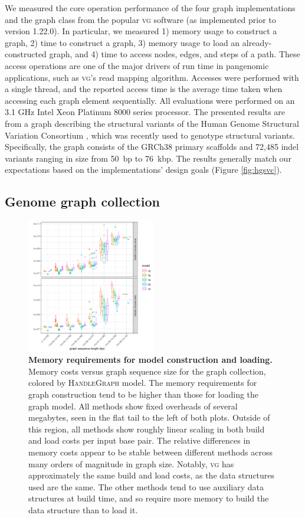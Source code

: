 \documentclass{bioinfo}
\begin{document}
We measured the core operation performance of the four graph implementations and the graph class from the popular \textsc{vg} software (as implemented prior to version 1.22.0).
In particular, we measured 1) memory usage to construct a graph, 2) time to construct a graph, 3) memory usage to load an already-constructed graph, and 4) time to access nodes, edges, and steps of a path.
These access operations are one of the major drivers of run time in pangenomic applications, such as \textsc{vg}'s read mapping algorithm. 
Accesses were performed with a single thread, and the reported access time is the average time taken when accessing each graph element sequentially.
All evaluations were performed on an 3.1 GHz Intel Xeon Platinum 8000 series processor.
The presented results are from a graph describing the structural variants of the Human Genome Structural Variation Consortium \citep{chaisson2019multi}, which was recently used to genotype structural variants\citep{hickey2020genotyping}.
Specifically, the graph consists of the GRCh38 primary scaffolds and 72,485 indel variants ranging in size from 50~bp to 76~kbp.
The results generally match our expectations based on the implementations' design goals (Figure \ref{fig:hgsvc}).

\subsection{Genome graph collection}

\begin{figure}
  \centering
  \includegraphics[width=0.5\textwidth]{figures/build_and_load_memory_boxplot.pdf}
  \caption{
    \label{fig:prof1}
    \textbf{Memory requirements for model construction and loading.}
    Memory costs versus graph sequence size for the graph collection, colored by \textsc{HandleGraph} model.
    The memory requirements for graph construction tend to be higher than those for loading the graph model.
    All methods show fixed overheads of several megabytes, seen in the flat tail to the left of both plots.
    Outside of this region, all methods show roughly linear scaling in both build and load costs per input base pair.
    The relative differences in memory costs appear to be stable between different methods across many orders of magnitude in graph size.
    Notably, \textsc{vg} has approximately the same build and load costs, as the data structures used are the same.
    The other methods tend to use auxiliary data structures at build time, and so require more memory to build the data structure than to load it.
    }
\end{figure}
\end{document}
